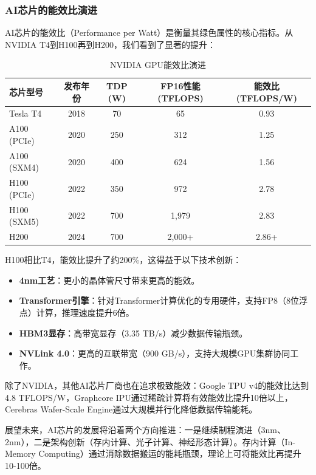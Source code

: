 \subsubsection{AI芯片的能效比演进}

AI芯片的能效比（Performance per Watt）是衡量其绿色属性的核心指标。从NVIDIA T4到H100再到H200，我们看到了显著的提升：

\begin{table}[htbp]
\centering
\caption{NVIDIA GPU能效比演进}
\begin{tabular}{lcccc}
\toprule
\textbf{芯片型号} & \textbf{发布年份} & \textbf{TDP (W)} & \textbf{FP16性能 (TFLOPS)} & \textbf{能效比 (TFLOPS/W)} \\
\midrule
Tesla T4 & 2018 & 70 & 65 & 0.93 \\
A100 (PCIe) & 2020 & 250 & 312 & 1.25 \\
A100 (SXM4) & 2020 & 400 & 624 & 1.56 \\
H100 (PCIe) & 2022 & 350 & 972 & 2.78 \\
H100 (SXM5) & 2022 & 700 & 1,979 & 2.83 \\
H200 & 2024 & 700 & 2,000+ & 2.86+ \\
\bottomrule
\end{tabular}
\label{tab:nvidia-gpu-efficiency}
\end{table}

H100相比T4，能效比提升了约200\%，这得益于以下技术创新：

\begin{itemize}
    \item \textbf{4nm工艺}：更小的晶体管尺寸带来更高的能效。

    \item \textbf{Transformer引擎}：针对Transformer计算优化的专用硬件，支持FP8（8位浮点）计算，推理速度提升6倍。

    \item \textbf{HBM3显存}：高带宽显存（3.35 TB/s）减少数据传输瓶颈。

    \item \textbf{NVLink 4.0}：更高的互联带宽（900 GB/s），支持大规模GPU集群协同工作。
\end{itemize}

除了NVIDIA，其他AI芯片厂商也在追求极致能效：Google TPU v4的能效比达到4.8 TFLOPS/W，Graphcore IPU通过稀疏计算将有效能效比提升10倍以上，Cerebras Wafer-Scale Engine通过大规模并行化降低数据传输能耗。

展望未来，AI芯片的发展将沿着两个方向推进：一是继续制程演进（3nm、2nm），二是架构创新（存内计算、光子计算、神经形态计算）。存内计算（In-Memory Computing）通过消除数据搬运的能耗瓶颈，理论上可将能效比再提升10-100倍。

